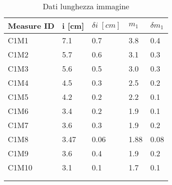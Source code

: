 \begin{longtable}[]{@{}lllll@{}}
    \toprule
    Measure ID & i [cm] & $\delta i \; [cm]$ & $m_1$ & $\delta m_1$ \tabularnewline
    \midrule
    \endhead
    C1M1 & 7.1 & 0.7 & 3.8 & 0.4 \tabularnewline
    C1M2 & 5.7 & 0.6 & 3.1 & 0.3 \tabularnewline
    C1M3 & 5.6 & 0.5 & 3.0 & 0.3 \tabularnewline
    C1M4 & 4.5 & 0.3 & 2.5 & 0.2 \tabularnewline
    C1M5 & 4.2 & 0.2 & 2.2 & 0.1 \tabularnewline
    C1M6 & 3.4 & 0.2 & 1.9 & 0.1 \tabularnewline
    C1M7 & 3.6 & 0.3 & 1.9 & 0.2 \tabularnewline
    C1M8 & 3.47 & 0.06 & 1.88 & 0.08 \tabularnewline
    C1M9 & 3.6 & 0.4 & 1.9 & 0.2 \tabularnewline
    C1M10 &3.1 & 0.1 & 1.7 & 0.1 \tabularnewline
    \bottomrule
    \label{tab:immagine}
    \\
    \caption{Dati lunghezza immagine}
 \end{longtable}
